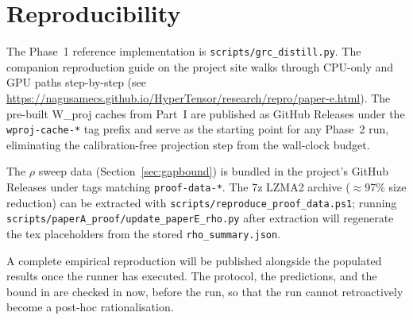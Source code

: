 \documentclass[11pt]{article}
\begin{document}
\section{Reproducibility}
\label{sec:repro}

The Phase~1 reference implementation is \texttt{scripts/grc\_distill.py}.
The companion reproduction guide on the project site walks through CPU-only
and GPU paths step-by-step (see
\url{https://nagusamecs.github.io/HyperTensor/research/repro/paper-e.html}).
The pre-built W\_proj caches from Part~I are published as GitHub
Releases under the \texttt{wproj-cache-*} tag prefix and serve as the
starting point for any Phase~2 run, eliminating the calibration-free
projection step from the wall-clock budget.

The $\rho$ sweep data (Section~\ref{sec:gapbound}) is bundled in the
project's GitHub Releases under tags matching \texttt{proof-data-*}.
The 7z LZMA2 archive ($\approx$97\% size reduction) can be extracted with
\texttt{scripts/reproduce\_proof\_data.ps1}; running
\texttt{scripts/paperA\_proof/update\_paperE\_rho.py} after extraction
will regenerate the tex placeholders from the stored
\texttt{rho\_summary.json}.

A complete empirical reproduction will be published alongside the
populated results once the runner has executed. The protocol, the
predictions, and the bound in  are checked in now,
before the run, so that the run cannot retroactively become a
post-hoc rationalisation.

\printbibliography
\end{document}
